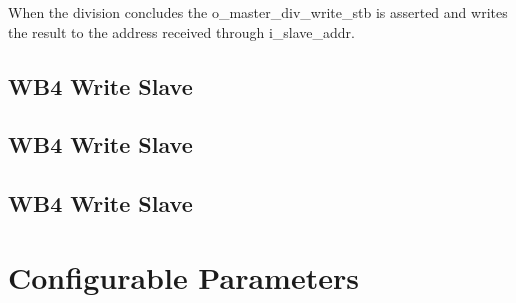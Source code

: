\documentclass[letterpaper]{article}
\begin{document}
	When the division concludes  the o\_master\_div\_write\_stb is asserted and writes the result to the address received through i\_slave\_addr.
	\subsection{WB4 Write Slave}
		
	\subsection{WB4 Write Slave}
	
	\subsection{WB4 Write Slave}
	
	\section{Configurable Parameters}
		
\end{document}
